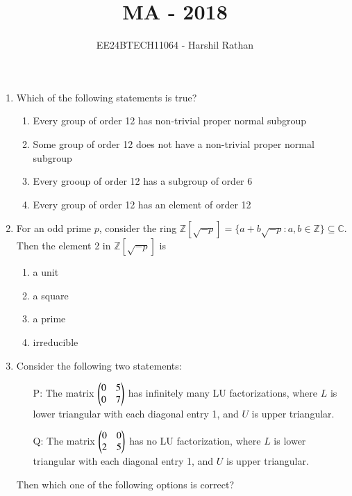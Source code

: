 \documentclass[journal]{IEEEtran}
\begin{document}

\vspace{3cm}

\title{MA - 2018}
\author{EE24BTECH11064 - Harshil Rathan}
\maketitle

\renewcommand{\thefigure}{\theenumi}
\renewcommand{\thetable}{\theenumi}

\begin{enumerate}
\item Which of the following statements is true?
\begin{enumerate}
    \item Every group of order 12 has non-trivial proper normal subgroup
    \item Some group of order 12 does not have a non-trivial proper normal subgroup
    \item Every grooup of order 12 has a subgroup of order 6
    \item Every group of order 12 has an element of order 12 
\end{enumerate}

\vspace{0.5cm}
\item For an odd prime $p$, consider the ring $\mathbb{Z}[\sqrt{-p}]=\{a+b\sqrt{-p}:a,b\in \mathbb{Z}\}\subseteq \mathbb{C}$. Then the element 2 in $\mathbb{Z}[\sqrt{-p}]$ is 
\begin{multicols}{2}
    \begin{enumerate}
        \item a unit
        \item a square
        \item a prime 
        \item irreducible
    \end{enumerate}
\end{multicols}

\vspace{0.5cm}
\item Consider the following two statements:
\begin{itemize}
    \item[P:] The matrix 
    $\begin{pmatrix}0&5\\0&7\end{pmatrix}$
    has infinitely many LU factorizations, where \( L \) is lower triangular with each diagonal entry 1, and \( U \) is upper triangular.
    
    \item[Q:] The matrix 
    $\begin{pmatrix}0&0\\2&5\end{pmatrix}$
    has no LU factorization, where \( L \) is lower triangular with each diagonal entry 1, and \( U \) is upper triangular.
\end{itemize}
Then which one of the following options is correct?


\end{enumerate}
\end{document}
